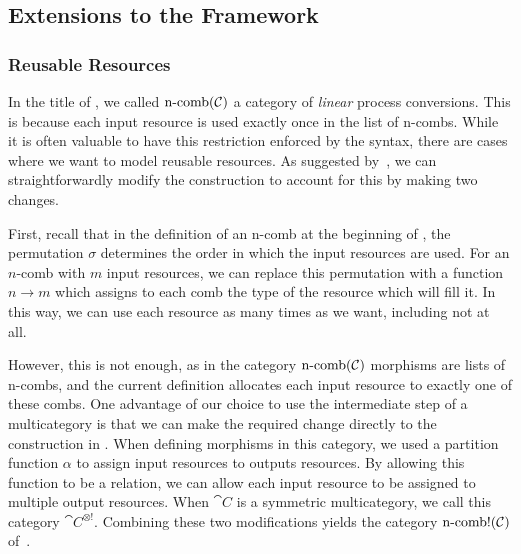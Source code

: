 \subsection{Extensions to the Framework}

\subsubsection{Reusable Resources}
In the title of
,
we called $\operatorname*{n-comb}({\mathcal{C}})$ a category of \emph{linear} process conversions.
This is because each input resource is used exactly once in the list of n-combs.
While it is often valuable to have this restriction enforced by the syntax,
there are cases where we want to model reusable resources. As suggested
by~\cite{broadbent-karvonen-2022}, we can straightforwardly modify the
construction to account for this by making two changes.

First, recall that in the definition of an n-comb at the beginning of
,
the permutation $\sigma$ determines the order in which the input resources are
used. For an $n$-comb with $m$ input resources, we can replace this permutation
with a function $n\to m$ which assigns to each comb the type of the resource
which will fill it. In this way, we can use each resource as many times
as we want, including not at all.

However, this is not enough, as in the category $\operatorname*{n-comb}({\mathcal{C}})$ morphisms are
lists of n-combs, and the current definition allocates each input resource to
exactly one of these combs. One advantage of our choice to use the intermediate
step of a multicategory is that we can make the required change directly to the
construction in . When
defining morphisms in this category, we used a partition function $\alpha$ to
assign input resources to outputs resources. By allowing this function to be a
relation, we can allow each input resource to be assigned to multiple output
resources. When $\cat{C}$ is a symmetric multicategory, we call this category
$\cat{C}^{\otimes!}$. Combining these two modifications yields the category
$\operatorname*{n-comb!}({\mathcal{C}})$ of~\cite{broadbent-karvonen-2022}.

